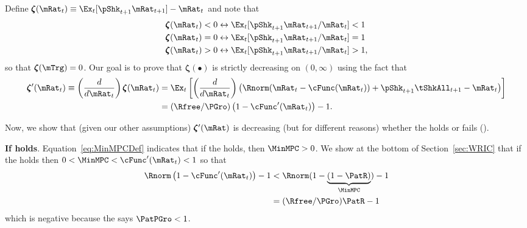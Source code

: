 \documentclass[\econtexRoot/BufferStockTheory]{subfiles}
\begin{document}
Define \providecommand{\difFunc}{\pmb{\zeta}} $\difFunc(\mRat_t) \equiv 
\Ex_t[\pShk_{t+1}\mRat_{t+1}] - \mRat_t$ and note that
\begin{equation}\begin{gathered}\begin{aligned}\label{eq:difRatioEquiv}
  \difFunc(\mRat_t) < 0 &\leftrightarrow \Ex_t[\pShk_{t+1}\mRat_{t+1}/\mRat_{t}] < 1 
                          \nonumber\\
  \difFunc(\mRat_t) = 0 &\leftrightarrow \Ex_t[\pShk_{t+1}\mRat_{t+1}/\mRat_{t}] = 1\\
  \difFunc(\mRat_t) > 0 &\leftrightarrow \Ex_t[\pShk_{t+1}\mRat_{t+1}/\mRat_{t}] > 
                          1,\nonumber
\end{aligned}\end{gathered}\end{equation}
so that $\difFunc(\mTrg)=0$. Our goal is to prove that $\difFunc(\bullet)$ is strictly 
decreasing on $(0,\infty)$ using the fact that
\begin{equation}\begin{gathered}\begin{aligned}
  \difFunc^{\prime}(\mRat_{t}) \equiv  \left( \frac{d}{d\mRat_{t}}\right) \difFunc(\mRat_t)  & = \Ex_{t}\left[
                                                                                               \left( \frac{d}{d\mRat_{t}}\right) \left( 
                                                                                               {\Rnorm}(\mRat_{t}-\cFunc(\mRat_{t}))+%
                                                                                               {\pShk}_{t+1}{\tShkAll}_{t+1} - {\mRat}_t\right) \right] \label{eq:difFuncDecreases} \\
                                                                                             & = (\Rfree/\PGro)\left(1-\cFunc^{\prime}({\mRat}_t)\right) - 1.  \notag
\end{aligned}\end{gathered}\end{equation}

Now, we show that (given our other assumptions) $\difFunc^{\prime}(\mRat)$ is decreasing (but for different reasons) whether the {\RIC} holds or fails (\cncl{\RIC}).

\textbf{If {\RIC} holds}. Equation~\eqref{eq:MinMPCDef} indicates that if the {\RIC} holds, then $\MinMPC >0$.  We show at the bottom of Section~\ref{sec:WRIC} that if the {\RIC} holds then $0 < \MinMPC < \cFunc^{\prime}(\mRat_{t}) < 1$ so that 
\begin{align*}
  \Rnorm\left(1-\cFunc^{\prime}({\mRat}_t)\right) - 1 & <  \Rnorm(1-\underbrace{(1-\PatR)}_{\MinMPC}) - 1  \\
                                                      & = (\Rfree/\PGro)\PatR - 1 
\end{align*}
which is negative because the {\GICRaw} says $\PatPGro < 1$.  
\end{document}
